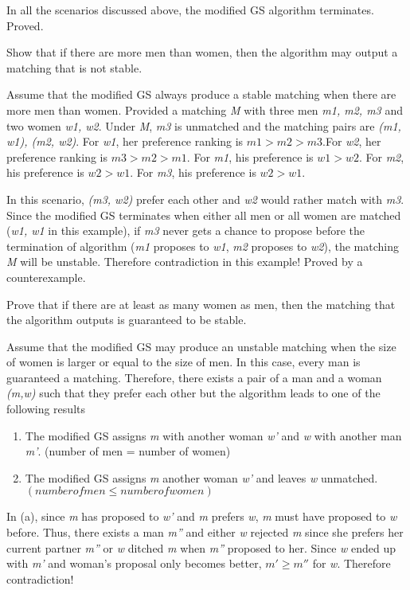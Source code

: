 \documentclass{homework}
\begin{document}
\begin{enumerate}
    In all the scenarios discussed above, the modified GS algorithm terminates. Proved.
    
    
    \question Show that if there are more men than women, then the algorithm may output a matching that is not stable.
    
    Assume that the modified GS always produce a stable matching when there are more men than women. Provided a matching \textit{M} with three men \textit{m1, m2, m3} and two women \textit{w1, w2}. Under \textit{M}, \textit{m3} is unmatched and the matching pairs are \textit{(m1, w1), (m2, w2)}.  For \textit{w1}, her preference ranking is \textit{$m1 > m2 > m3$}.For \textit{w2}, her preference ranking is \textit{$m3 > m2 > m1$}. For \textit{m1}, his preference is \textit{$w1 > w2$}. For \textit{m2}, his preference is \textit{$w2 > w1$}. For \textit{m3}, his preference is \textit{$w2 > w1$}.
    
    In this scenario, \textit{(m3, w2)} prefer each other and \textit{w2} would rather match with \textit{m3}. Since the modified GS terminates when either all men or all women are matched (\textit{w1, w1} in this example), if \textit{m3} never gets a chance to propose before the termination of algorithm (\textit{m1} proposes to \textit{w1}, \textit{m2} proposes to \textit{w2}), the matching \textit{M} will be unstable. Therefore contradiction in this example! Proved by a counterexample.
    
    \question Prove that if there are at least as many women as men, then the matching that the algorithm outputs is guaranteed to be stable.
    
    Assume that the modified GS may produce an unstable matching when the size of women is larger or equal to the size of men. In this case, every man is guaranteed a matching. Therefore, there exists a pair of a man and a woman \textit{(m,w)} such that they prefer each other but the algorithm leads to one of the following results
    \begin{enumerate}
        \item The modified GS assigns \textit{m} with another woman \textit{w'} and \textit{w} with another man \textit{m'}. (number of men = number of women)
        \item The modified GS assigns \textit{m} another woman \textit{w'} and leaves \textit{w} unmatched. $(number of men \leq number of women)$
    \end{enumerate}
    
    In (a), since \textit{m} has proposed to \textit{w'} and \textit{m} prefers \textit{w}, \textit{m} must have proposed to \textit{w} before. Thus, there exists a man \textit{m''} and either \textit{w} rejected \textit{m} since she prefers her current partner \textit{m''} or \textit{w} ditched \textit{m} when \textit{m''} proposed to her. Since \textit{w} ended up with \textit{m'} and woman's proposal only becomes better, \textit{$m' \geq m''$} for \textit{w}. Therefore contradiction!
    

\end{enumerate}
\end{document}
